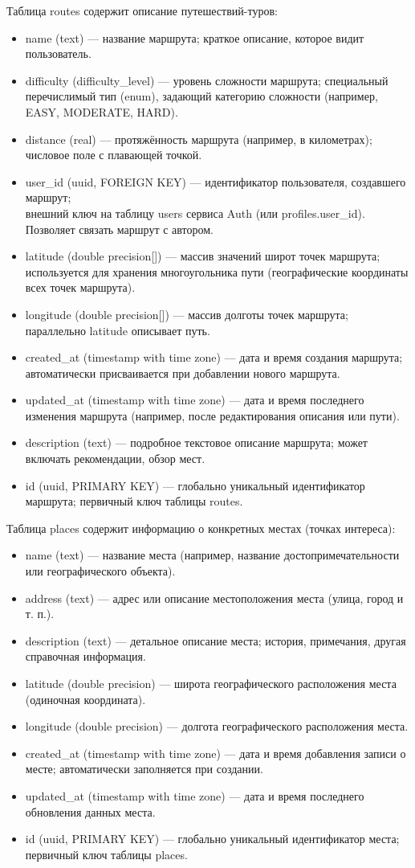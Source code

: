 Таблица routes содержит описание путешествий-туров:
\begin{itemize}
    \item name (text) — название маршрута; краткое описание, которое видит пользователь.
    \item difficulty (difficulty\_level) — уровень сложности маршрута; специальный перечислимый тип (enum), задающий категорию сложности (например, EASY, MODERATE, HARD).
    \item distance (real) — протяжённость маршрута (например, в километрах); числовое поле с плавающей точкой.
    \item user\_id (uuid, FOREIGN KEY) — идентификатор пользователя, создавшего маршрут; \\ внешний ключ на таблицу users сервиса Auth (или profiles.user\_id). Позволяет связать маршрут с автором.
    \item latitude (double precision[]) — массив значений широт точек маршрута; используется для хранения многоугольника пути (географические координаты всех точек маршрута).
    \item longitude (double precision[]) — массив долготы точек маршрута; параллельно latitude описывает путь.
    \item created\_at (timestamp with time zone) — дата и время создания маршрута; автоматически присваивается при добавлении нового маршрута.
    \item updated\_at (timestamp with time zone) — дата и время последнего изменения маршрута (например, после редактирования описания или пути).
    \item description (text) — подробное текстовое описание маршрута; может включать рекомендации, обзор мест.
    \item id (uuid, PRIMARY KEY) — глобально уникальный идентификатор маршрута; первичный ключ таблицы routes.
\end{itemize}
Таблица places содержит информацию о конкретных местах (точках интереса):
\begin{itemize}
    \item name (text) — название места (например, название достопримечательности или географического объекта).
    \item address (text) — адрес или описание местоположения места (улица, город и т. п.).
    \item description (text) — детальное описание места; история, примечания, другая справочная информация.
    \item latitude (double precision) — широта географического расположения места (одиночная координата).
    \item longitude (double precision) — долгота географического расположения места.
    \item created\_at (timestamp with time zone) — дата и время добавления записи о месте; автоматически заполняется при создании.
    \item updated\_at (timestamp with time zone) — дата и время последнего обновления данных места.
    \item id (uuid, PRIMARY KEY) — глобально уникальный идентификатор места; первичный ключ таблицы places.
\end{itemize}
